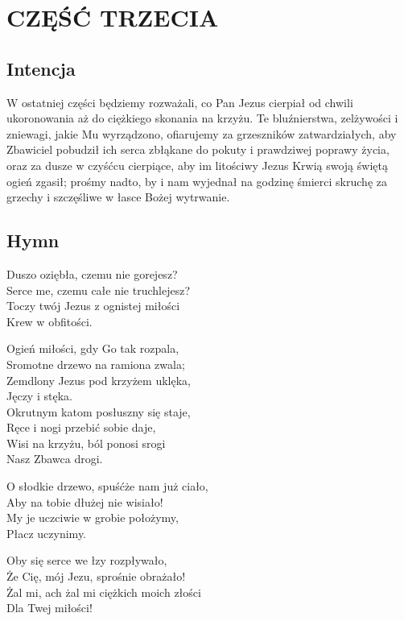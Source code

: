 \section{CZĘŚĆ TRZECIA}



\subsection{Intencja}

W ostatniej części będziemy rozważali, co Pan Jezus cierpiał od chwili
ukoronowania aż do ciężkiego skonania na krzyżu. Te bluźnierstwa,
zelżywości i zniewagi, jakie Mu wyrządzono, ofiarujemy za grzeszników
zatwardziałych, aby Zbawiciel pobudził ich serca zbłąkane do pokuty i
prawdziwej poprawy życia, oraz za dusze w czyśćcu cierpiące, aby im
litościwy Jezus Krwią swoją świętą ogień zgasił; prośmy nadto, by i nam
wyjednał na godzinę śmierci skruchę za grzechy i szczęśliwe w łasce
Bożej wytrwanie.


\subsection{Hymn}

Duszo oziębła, czemu nie gorejesz?\\
Serce me, czemu całe nie truchlejesz?\\
Toczy twój Jezus z ognistej miłości\\
Krew w obfitości.

Ogień miłości, gdy Go tak rozpala,\\
Sromotne drzewo na ramiona zwala;\\
Zemdlony Jezus pod krzyżem uklęka,\\
Jęczy i stęka.\\
Okrutnym katom posłuszny się staje,\\
Ręce i nogi przebić sobie daje,\\
Wisi na krzyżu, ból ponosi srogi\\
Nasz Zbawca drogi.

O słodkie drzewo, spuśćże nam już ciało,\\
Aby na tobie dłużej nie wisiało!\\
My je uczciwie w grobie położymy,\\
Płacz uczynimy.

Oby się serce we łzy rozpływało,\\
Że Cię, mój Jezu, sprośnie obrażało!\\
Żal mi, ach żal mi ciężkich moich złości\\
Dla Twej miłości!

